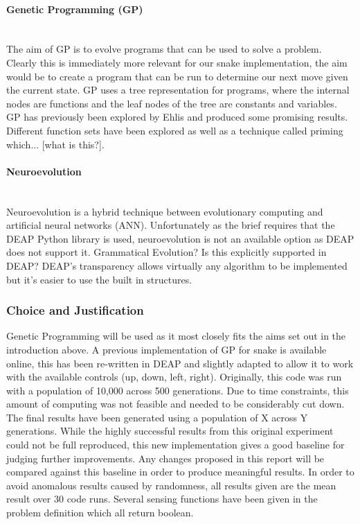\documentclass{article}
\newcommand{\myparagraph}[1]{\paragraph{#1}\mbox{}\\}
\begin{document}
\myparagraph{Genetic Programming (GP)}
The aim of GP is to evolve programs that can be used to solve a problem. Clearly this is immediately more relevant for our snake implementation, the aim would be to create a program that can be run to determine our next move given the current state. GP uses a tree representation for programs, where the internal nodes are functions and the leaf nodes of the tree are constants and variables.
\\
GP has previously been explored by Ehlis\cite{snake_blog} and produced some promising results. Different function sets have been explored as well as a technique called priming which... [what is this?].

\myparagraph{Neuroevolution}
Neuroevolution is a hybrid technique between evolutionary computing and artificial neural networks (ANN).
Unfortunately as the brief requires that the DEAP Python library is used, neuroevolution is not an available option as DEAP does not support it.
Grammatical Evolution? Is this explicitly supported in DEAP?\cite{deap}
DEAP's transparency allows virtually any algorithm to be implemented but it's easier to use the built in structures.



\subsubsection{Choice and Justification}
Genetic Programming will be used as it most closely fits the aims set out in the introduction above. A previous implementation of GP for snake is available online\cite{snake_blog}, this has been re-written in DEAP and slightly adapted to allow it to work with the available controls (up, down, left, right). Originally, this code was run with a population of 10,000 across 500 generations. Due to time constraints, this amount of computing was not feasible and needed to be considerably cut down. The final results have been generated using a population of X across Y generations. While the highly successful results from this original experiment could not be full reproduced, this new implementation gives a good baseline for judging further improvements. Any changes proposed in this report will be compared against this baseline in order to produce meaningful results. In order to avoid anomalous results caused by randomness, all results given are the mean result over 30 code runs.%
Several sensing functions have been given in the problem definition which all return boolean.
\end{document}
